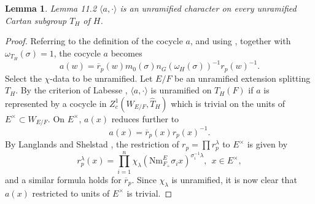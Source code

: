 \documentclass[11pt]{amsart}
\theoremstyle{plain}
\newtheorem{lemma}[theorem]{Lemma}
\theoremstyle{definition}
\def\Gal{\operatorname{\text{Gal}}}          %
\def\Def{\overset{\operatorname{def}}\to=}   %
\def\what#1{\widehat#1}
\def\tild#1{\widetilde#1}
\def\LABESSEC{19}
\def\LANGLANDSO{21}
\begin{document}
\begin{lemma}{Lemma 11.2}  $\langle a,\cdot \rangle$ is an unramified
character on every unramified Cartan subgroup $T_H$ of $H$.\end{lemma}

\begin{proof}  %
Referring to the definition of the cocycle $a$, and
using \cite{\LANGLANDSO, 2.1.A}, together with $\omega_{T_H}(\sigma)=1$, the
cocycle $a$ becomes
$$
a(w) = \overline r_p(w)m_0(\sigma)n_G(\omega_H(\sigma))^{-1}r_p(w)^{-1}.
$$
Select the $\chi$-data to be unramified.
Let $E/F$ be an unramified extension splitting $T_H$.  By
the criterion of Labesse \cite{\LABESSEC,6.3,5.9}, $\langle a,\cdot\rangle$
is unramified on $T_H(F)$ if $a$ is represented by a cocycle
in $Z_c^1(W_{E/F},\what T_H)$ which is trivial on the units of $E^\times
\subset W_{E/F}$.  On $E^\times$, $a(x)$ reduces further to
$$a(x) = \overline r_p(x) r_p(x)^{-1}.$$
By Langlands and Shelstad \cite{\LANGLANDSO,p237}, the restriction
of $r_p =\prod r_p^\lambda$ to $E^\times$ is given by
$$r_p^\lambda(x) = \prod_{i=1}^n\chi_\lambda(\text{Nm}^E_{F_+}
	\sigma_ix)^{\sigma_i^{-1}\lambda},\ \ x\in E^\times,$$
and a similar formula holds for $\overline r_p$.  Since $\chi_\lambda$ is
unramified, it is now clear that $a(x)$ restricted to units of
$E^\times$ is trivial.
\end{proof}




\end{document}
